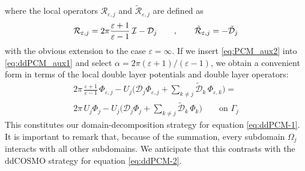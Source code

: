 where the local operators ${\mathcal{R}}_{\varepsilon,j}$ and $\tilde{\mathcal{R}}_{\varepsilon,j}$ are defined as
\[
{\mathcal{R}}_{\varepsilon,j} = 2 \pi \frac{\varepsilon + 1}{\varepsilon - 1} \, \mathcal{I} - {\mathcal{D}}_j  \qquad, \qquad
\tilde{\mathcal{R}}_{\varepsilon,j} =  - \tilde{\mathcal{D}}_j
\]
with the obvious extension to the case $\varepsilon = \infty$. 
%
If we insert \eqref{eq:PCM_aux2} into \eqref{eq:ddPCM_aux1} and select $\alpha = 2\pi(\varepsilon + 1)/(\varepsilon - 1)$, we obtain a convenient form in terms of the local double layer potentials and double layer operators:
\begin{multline}\label{eq:1}
2\pi \, \frac{\varepsilon + 1}{\varepsilon - 1} \, \Phi_{\varepsilon,j} - U_j \bigg( {\mathcal{D}}_j \Phi_{\varepsilon,j} + \sum_{k \ne j} \tilde{\mathcal{D}}_{k} \, \Phi_{\varepsilon,k}  \bigg) = \\ 2 \pi \, U_j \Phi_j - U_j \bigg( {\mathcal{D}}_j \Phi_{j} + \sum_{k \ne j} \tilde{\mathcal{D}}_{k} \, \Phi_{k}  \bigg) \qquad \text{on }\Gamma_j
\end{multline}
This constitutes our domain-decomposition strategy for equation \eqref{eq:ddPCM-1}. It is important to remark that, because of the summation, every subdomain $\Omega_j$ interacts with all other subdomains. We anticipate that this contrasts with the ddCOSMO strategy for equation \eqref{eq:ddPCM-2}.

